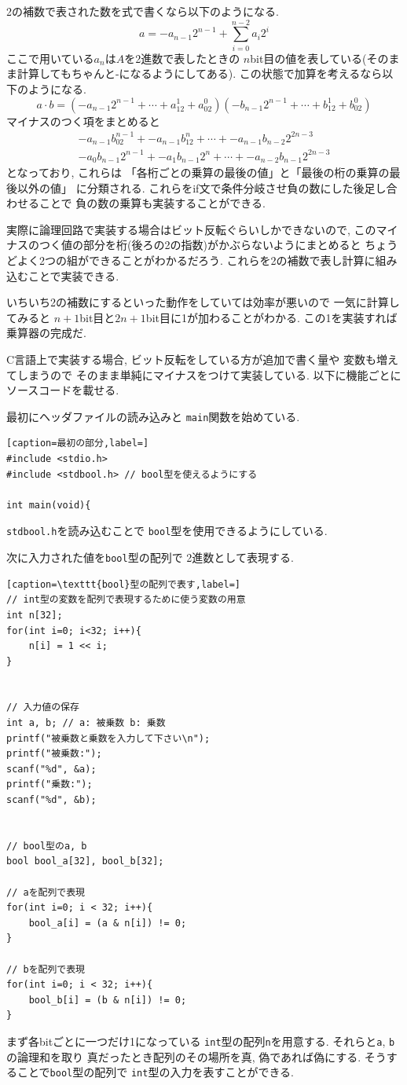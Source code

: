 \documentclass[a4paper, xelatex, ja=standard]{bxjsarticle}
\begin{document}
2の補数で表された数を式で書くなら以下のようになる.
\[
a = -a_{n-1}2^{n-1}+\sum_{i=0}^{n-2}a_i2^i
\]
ここで用いている$a_n$は$A$を2進数で表したときの
$n$bit目の値を表している(そのまま計算してもちゃんと-になるようにしてある).
この状態で加算を考えるなら以下のようになる.
\[
a \cdot b=(-a_{n-1}2^{n-1}+\cdots+a_12^1+a_02^0)(-b_{n-1}2^{n-1}+\cdots+b_12^1+b_02^0)
\]
マイナスのつく項をまとめると
\begin{align*}
-a_{n-1}b_02^{n-1}+-a_{n-1}b_12^{n}+\cdots+-a_{n-1}b_{n-2}2^{2n-3} \\
-a_0b_{n-1}2^{n-1}+-a_1b_{n-1}2^{n}+\cdots+-a_{n-2}b_{n-1}2^{2n-3}
\end{align*}
となっており, これらは
「各桁ごとの乗算の最後の値」と「最後の桁の乗算の最後以外の値」
に分類される.
これらをif文で条件分岐させ負の数にした後足し合わせることで
負の数の乗算も実装することができる.

実際に論理回路で実装する場合はビット反転ぐらいしかできないので,
このマイナスのつく値の部分を桁(後ろの2の指数)がかぶらないようにまとめると
ちょうどよく2つの組ができることがわかるだろう.
これらを2の補数で表し計算に組み込むことで実装できる.

いちいち2の補数にするといった動作をしていては効率が悪いので
一気に計算してみると
$n+1$bit目と$2n+1$bit目に1が加わることがわかる.
この1を実装すれば乗算器の完成だ.

C言語上で実装する場合,
ビット反転をしている方が追加で書く量や
変数も増えてしまうので
そのまま単純にマイナスをつけて実装している.
以下に機能ごとにソースコードを載せる.

最初にヘッダファイルの読み込みと
\texttt{main}関数を始めている.
\begin{lstlisting}[caption=最初の部分,label=]
#include <stdio.h>
#include <stdbool.h> // bool型を使えるようにする

int main(void){
\end{lstlisting}
\texttt{stdbool.h}を読み込むことで
\texttt{bool}型を使用できるようにしている.

次に入力された値を\texttt{bool}型の配列で
2進数として表現する.
\begin{lstlisting}[caption=\texttt{bool}型の配列で表す,label=]
// int型の変数を配列で表現するために使う変数の用意
int n[32];
for(int i=0; i<32; i++){
	n[i] = 1 << i;
}


// 入力値の保存
int a, b; // a: 被乗数 b: 乗数
printf("被乗数と乗数を入力して下さい\n");
printf("被乗数:");
scanf("%d", &a);
printf("乗数:");
scanf("%d", &b);


// bool型のa, b
bool bool_a[32], bool_b[32];

// aを配列で表現
for(int i=0; i < 32; i++){
	bool_a[i] = (a & n[i]) != 0;
}

// bを配列で表現
for(int i=0; i < 32; i++){
	bool_b[i] = (b & n[i]) != 0;
}
\end{lstlisting}
まず各bitごとに一つだけ1になっている
\texttt{int}型の配列\texttt{n}を用意する.
それらと\texttt{a}, \texttt{b}の論理和を取り
真だったとき配列のその場所を真, 偽であれば偽にする.
そうすることで\texttt{bool}型の配列で
\texttt{int}型の入力を表すことができる.
\end{document}

